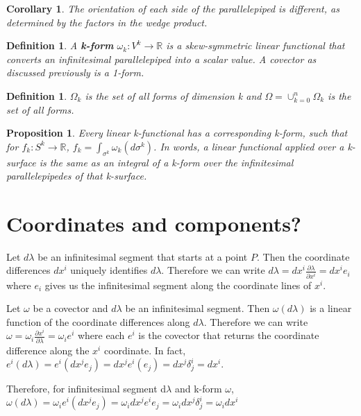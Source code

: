 \documentclass{book}
\newtheorem{defn}[equation]{Definition}
\newtheorem{coro}[equation]{Corollary}
\newtheorem{prop}[equation]{Proposition}
\begin{document}
\begin{coro}
	The orientation of each side of the parallelepiped is different, as determined by the factors in the wedge product. 
\end{coro}

\begin{defn}
	A \textbf{k-form} $\omega_k : V^k \to \mathbb{R}$ is a skew-symmetric linear functional that converts an infinitesimal parallelepiped into a scalar value. A covector as discussed previously is a 1-form. 
\end{defn}

\begin{defn}
	$\Omega_k$ is the set of all forms of dimension k and $\Omega = \cup_{k=0}^n\Omega_k$ is the set of all forms. 
\end{defn}

\begin{prop}
	Every linear k-functional has a corresponding k-form, such that for $f_k : S^k \to \mathbb{R}$, $f_k = \int_{\sigma^k} \omega_k(d\sigma^k)$. In words, a linear functional applied over a k-surface is the same as an integral of a k-form over the infinitesimal parallelepipedes of that k-surface. 
\end{prop}

\section{Coordinates and components?}

Let $d\lambda$ be an infinitesimal segment that starts at a point $P$. Then the coordinate differences $dx^i$ uniquely identifies $d\lambda$. Therefore we can write $d\lambda = dx^i \frac{\partial \lambda}{\partial x^i} = dx^i e_i$ where $e_i$ gives us the infinitesimal segment along the coordinate lines of $x^i$.

Let $\omega$ be a covector and $d\lambda$ be an infinitesimal segment. Then $\omega(d\lambda)$ is a linear function of the coordinate differences along $d\lambda$. Therefore we can write $\omega = \omega_i \frac{\partial x^i}{\partial \lambda} = \omega_i e^i$ where each $e^i$ is the covector that returns the coordinate difference along the $x^i$ coordinate. In fact, $e^i(d\lambda) = e^i(dx^j e_j) = dx^j e^i(e_j) = dx^j \delta^i_j = dx^i$.


Therefore, for infinitesimal segment d$\lambda$ and k-form $\omega$, $\omega(d\lambda) = \omega_ie^i(dx^je_j) = \omega_idx^je^ie_j = \omega_idx^j\delta^i_j = \omega_i dx^i$ 
\end{document}
